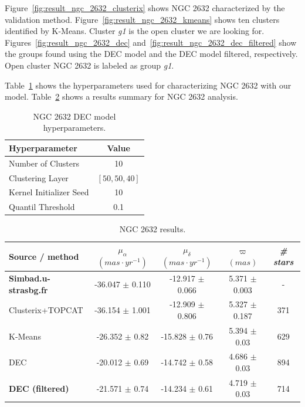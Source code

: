 \documentclass[11pt, a4paper, english]{book}
\begin{document}
\newpage

Figure~\ref{fig:result_ngc_2632_clusterix} shows NGC 2632 characterized by the validation method.
Figure~\ref{fig:result_ngc_2632_kmeans} shows ten clusters identified by K-Means.
Cluster \emph{g1} is the open cluster we are looking for.
Figures~\ref{fig:result_ngc_2632_dec} and~\ref{fig:result_ngc_2632_dec_filtered}
show the groups found using the DEC model and the DEC model filtered, respectively.
Open cluster NGC 2632 is labeled as group \emph{g1}.

Table~\ref{tab:hyperparameters_ngc_2632} shows the hyperparameters used for characterizing NGC 2632
with our model. Table~\ref{tab:results_ngc_2632} shows a results summary for NGC 2632 analysis.

\vfill

\begin{table}[h]
  \begin{center}
    \begin{tabular}{l|c}
      \textbf{Hyperparameter} & \textbf{Value} \\
      \hline
      Number of Clusters & 10 \\
      Clustering Layer & \(\left[ 50, 50, 40 \right]\) \\
      Kernel Initializer Seed & 10 \\
      Quantil Threshold & 0.1 \\
    \end{tabular}
    \caption{NGC 2632 DEC model hyperparameters.}
    \label{tab:hyperparameters_ngc_2632}
  \end{center}
\end{table}

\vfill

\begin{table}[h]
  \begin{center}
    \begin{tabular}{l|c|c|c|c}
      \textbf{Source / method} & \emph{\(\mu_{\alpha}\) \((mas \cdot yr^{-1})\)} & \emph{\(\mu_{\delta}\) \((mas \cdot yr^{-1})\)}
      & \emph{\( \varpi \) \((mas)\)} & \emph{\# stars} \\
      \hline
      \textbf{Simbad.u-strasbg.fr} & -36.047 \( \pm \) 0.110 & -12.917 \( \pm \) 0.066 & 5.371 \( \pm \) 0.003 & - \\
      Clusterix+TOPCAT & -36.154 \( \pm \) 1.001 & -12.909 \( \pm \) 0.806 & 5.327 \( \pm \) 0.187 & 371 \\
      K-Means & -26.352 \( \pm \) 0.82 & -15.828 \( \pm \) 0.76 & 5.394 \( \pm \) 0.03 & 629 \\
      DEC & -20.012 \( \pm \) 0.69 & -14.742 \( \pm \) 0.58 & 4.686 \( \pm \) 0.03 & 894 \\
      \textbf{DEC (filtered)} & -21.571 \( \pm \) 0.74 & -14.234 \( \pm \) 0.61 & 4.719 \( \pm \) 0.03 & 714 \\
    \end{tabular}
    \caption{NGC 2632 results.}
    \label{tab:results_ngc_2632}
  \end{center}
\end{table}
\end{document}
